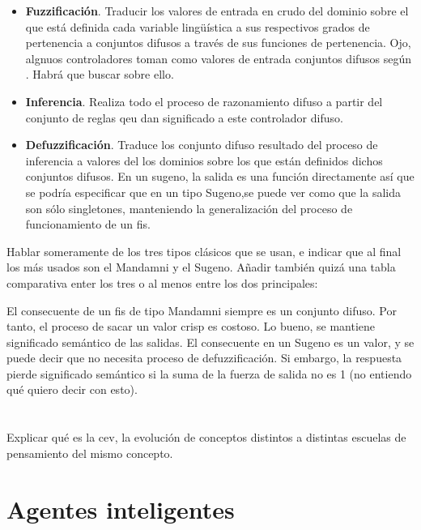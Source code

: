 \begin{itemize}
	\item \textbf{Fuzzificación}. Traducir los valores de entrada en crudo del dominio sobre el que está definida cada variable lingüística a sus respectivos grados de pertenencia a conjuntos difusos a través de sus funciones de pertenencia. \TODO Ojo, algnuos controladores toman como valores de entrada conjuntos difusos según \cite{Ma}. Habrá que buscar sobre ello.
	\item \textbf{Inferencia}. Realiza todo el proceso de razonamiento difuso a partir del conjunto de reglas qeu dan significado a este controlador difuso.
	\item \textbf{Defuzzificación}. Traduce los conjunto difuso resultado del proceso de inferencia a valores del los dominios sobre los que están definidos dichos conjuntos difusos. \TODO En un sugeno, la salida es una función directamente así que se podría especificar que en un tipo Sugeno,se puede ver como que la salida son sólo singletones, manteniendo la generalización del proceso de funcionamiento de un \ac{fis}.
\end{itemize}

Hablar someramente de los tres tipos clásicos que se usan, e indicar que al final los más usados son el Mandamni y el Sugeno. Añadir también quizá una tabla comparativa enter los tres o al menos entre los dos principales:

El consecuente de un \ac{fis} de tipo Mandamni siempre es un conjunto difuso. Por tanto, el proceso de sacar un valor crisp es costoso. Lo bueno, se mantiene significado semántico de las salidas. El consecuente en un Sugeno es un valor, y se puede decir que no necesita proceso de defuzzificación. Si embargo, la respuesta pierde significado semántico si la suma de la fuerza de salida no es 1 (no entiendo qué quiero decir con esto).


\section{}

Explicar qué es la cev, la evolución de conceptos distintos a distintas escuelas de pensamiento del mismo concepto.

\section{Agentes inteligentes}
\label{ch:ci:s:agent-concept}

